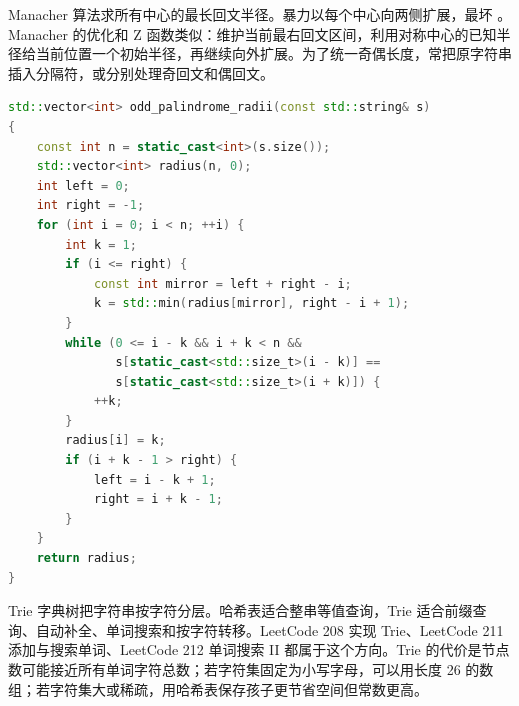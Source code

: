 Manacher 算法求所有中心的最长回文半径。暴力以每个中心向两侧扩展，最坏 。Manacher 的优化和 Z 函数类似：维护当前最右回文区间，利用对称中心的已知半径给当前位置一个初始半径，再继续向外扩展。为了统一奇偶长度，常把原字符串插入分隔符，或分别处理奇回文和偶回文。

\begin{lstlisting}[language=C++,caption={Manacher：奇数长度回文半径}]
std::vector<int> odd_palindrome_radii(const std::string& s)
{
    const int n = static_cast<int>(s.size());
    std::vector<int> radius(n, 0);
    int left = 0;
    int right = -1;
    for (int i = 0; i < n; ++i) {
        int k = 1;
        if (i <= right) {
            const int mirror = left + right - i;
            k = std::min(radius[mirror], right - i + 1);
        }
        while (0 <= i - k && i + k < n &&
               s[static_cast<std::size_t>(i - k)] ==
               s[static_cast<std::size_t>(i + k)]) {
            ++k;
        }
        radius[i] = k;
        if (i + k - 1 > right) {
            left = i - k + 1;
            right = i + k - 1;
        }
    }
    return radius;
}
\end{lstlisting}

Trie 字典树把字符串按字符分层。哈希表适合整串等值查询，Trie 适合前缀查询、自动补全、单词搜索和按字符转移。LeetCode 208 实现 Trie、LeetCode 211 添加与搜索单词、LeetCode 212 单词搜索 II 都属于这个方向。Trie 的代价是节点数可能接近所有单词字符总数；若字符集固定为小写字母，可以用长度 26 的数组；若字符集大或稀疏，用哈希表保存孩子更节省空间但常数更高。

